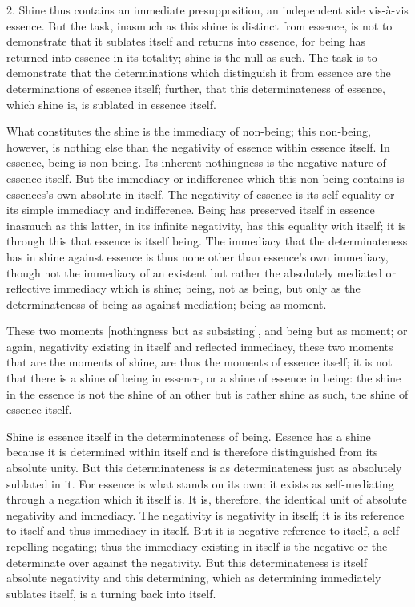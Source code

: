 2. Shine thus contains an immediate presupposition,
an independent side vis-à-vis essence.
But the task, inasmuch as this shine is distinct from essence,
is not to demonstrate that it sublates itself
and returns into essence,
for being has returned into essence in its totality;
shine is the null as such.
The task is to demonstrate that the determinations which
distinguish it from essence are the determinations of essence itself;
further, that this determinateness of essence,
which shine is, is sublated in essence itself.

What constitutes the shine is
the immediacy of non-being;
this non-being, however, is nothing else than
the negativity of essence within essence itself.
In essence, being is non-being.
Its inherent nothingness is the
negative nature of essence itself.
But the immediacy or indifference
which this non-being contains is
essences's own absolute in-itself.
The negativity of essence is its self-equality
or its simple immediacy and indifference.
Being has preserved itself in essence inasmuch
as this latter, in its infinite negativity,
has this equality with itself;
it is through this that essence is itself being.
The immediacy that the determinateness has
in shine against essence is
thus none other than essence's own immediacy,
though not the immediacy of an existent
but rather the absolutely mediated
or reflective immediacy which is shine;
being, not as being, but only as
the determinateness of being as against mediation;
being as moment.

These two moments [nothingness but as subsisting],
and being but as moment;
or again, negativity existing in itself and reflected immediacy,
these two moments that are the moments of shine,
are thus the moments of essence itself;
it is not that there is a shine of being in essence,
or a shine of essence in being:
the shine in the essence is not the shine of an other
but is rather shine as such, the shine of essence itself.

Shine is essence itself in the determinateness of being.
Essence has a shine because it is determined within itself
and is therefore distinguished from its absolute unity.
But this determinateness is as determinateness
just as absolutely sublated in it.
For essence is what stands on its own:
it exists as self-mediating through a negation which it itself is.
It is, therefore, the identical unit of absolute negativity and immediacy.
The negativity is negativity in itself;
it is its reference to itself and thus immediacy in itself.
But it is negative reference to itself,
a self-repelling negating;
thus the immediacy existing in itself is
the negative or the determinate over against the negativity.
But this determinateness is itself absolute negativity
and this determining, which as determining immediately sublates itself,
is a turning back into itself.

